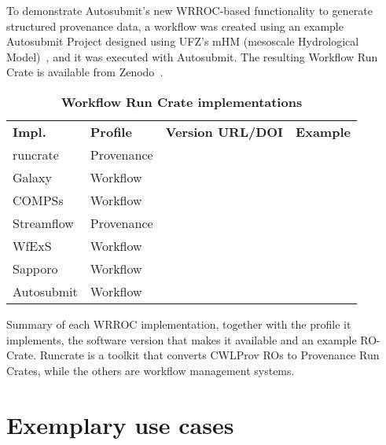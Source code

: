 \documentclass[10pt,letterpaper]{article}
\newlength\savedwidth
\newcommand\thickhline{\noalign{\global\savedwidth\arrayrulewidth\global\arrayrulewidth 2pt}%
\hline
\noalign{\global\arrayrulewidth\savedwidth}}
\begin{document}
To demonstrate Autosubmit's new WRROC-based functionality to generate structured provenance data, a workflow was created using an example Autosubmit Project designed using UFZ's mHM (mesoscale Hydrological Model)~\cite{Samaniego 2010,Kumar 2013}, and it was executed with Autosubmit. The resulting Workflow Run Crate is available from Zenodo~\cite{Kinoshita 2023}.

\begin{table}[htb]
  \begin{adjustwidth}{-1.4cm}{0in} %
  \centering
  \caption{
  {\bf Workflow Run Crate implementations}}
  \begin{tabular}{l|l|l|l}
  \hline
  {\bf Impl.} & {\bf Profile} & {\bf Version URL/DOI} &
  {\bf Example}\\
  \thickhline
  runcrate & Provenance & \footnotesize \cite{runcrate}  & \footnotesize \cite{run-pathology} \\
  Galaxy & Workflow & \footnotesize \cite{Galaxy 2023} & \footnotesize \cite{De Geest 2023} \\
  COMPSs & Workflow & \footnotesize \cite{Ejarque 2023} & \footnotesize \cite{Poiata 2023} \\
  Streamflow & Provenance & \footnotesize \cite{Colonnelli 2023b} & \footnotesize \cite{Colonnelli 2023} \\
  WfExS & Workflow & \footnotesize \cite{Fernandez 2024a} & \footnotesize \cite{Fernandez 2024b} \\
  Sapporo & Workflow & \footnotesize \cite{Suetake 2023b} & \footnotesize \cite{Ohta 2023} \\
  Autosubmit & Workflow & \footnotesize \cite{Beltran 2023} & \footnotesize \cite{Kinoshita 2023} \\
  \end{tabular}
  \begin{flushleft} 
    Summary of each WRROC implementation, together with the profile it implements, the software version that makes it available and an example RO-Crate. Runcrate is a toolkit that converts CWLProv ROs to Provenance Run Crates, while the others are workflow management systems.
  \end{flushleft}
  \label{implementation_summary_table}
  \end{adjustwidth}
\end{table}


\section{Exemplary use cases}\label{exemplary-use-cases}
\end{document}
